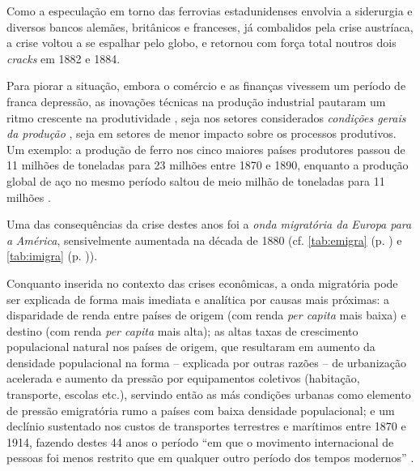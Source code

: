 Como a especulação em torno das ferrovias estadunidenses envolvia a siderurgia e diversos bancos alemães, britânicos e franceses, já combalidos pela crise austríaca, a crise voltou a se espalhar pelo globo, e retornou com força total noutros dois \textit{cracks} em 1882 e 1884.

Para piorar a situação, embora o comércio e as finanças vivessem um período de franca depressão, as inovações técnicas na produção industrial pautaram um ritmo crescente na produtividade \cite{hobsbawm_empire_1989}, seja nos setores considerados \textit{condições gerais da produção} \cite[p.~155-162]{BERNARDO1991}, seja em setores de menor impacto sobre os processos produtivos. Um exemplo: a produção de ferro nos cinco maiores países produtores passou de 11 milhões de toneladas para 23 milhões entre 1870 e 1890, enquanto a produção global de aço no mesmo período saltou de meio milhão de toneladas para 11 milhões \cite[p.~35]{hobsbawm_empire_1989}.

Uma das consequências da crise destes anos foi a \textit{onda migratória da} \textit{Europa para a }\textit{América}, sensivelmente aumentada na década de 1880 (cf. \autoref{tab:emigra} (p. \pageref{tab:emigra}) e \autoref{tab:imigra} (p. \pageref{tab:imigra})).





Conquanto inserida no contexto das crises econômicas, a onda migratória pode ser explicada de forma mais imediata e analítica por causas mais próximas: a disparidade de renda entre países de origem (com renda \textit{per capita} mais baixa) e destino (com renda \textit{per capita} mais alta); as altas taxas de crescimento populacional natural nos países de origem, que resultaram em aumento da densidade populacional na forma -- explicada por outras razões -- de urbanização acelerada e aumento da pressão por equipamentos coletivos (habitação, transporte, escolas etc.), servindo então as más condições urbanas como elemento de pressão emigratória rumo a países com baixa densidade populacional; e um declínio sustentado nos custos de transportes terrestres e marítimos entre 1870 e 1914, fazendo destes 44 anos o período ``em que o movimento internacional de pessoas foi menos restrito que em qualquer outro período dos tempos modernos'' \cite[p.~616]{heitger_migration_1993}.

